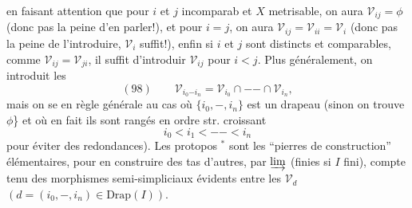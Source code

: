 
en faisant attention que pour $i$ et $j$ incomparab et $X$ metrisable, on  aura $\mathcal V_{ij}=\phi$  (donc pas la peine d'en parler!), et pour $i=j$, on aura $\mathcal V_{ij}=\mathcal V_{ii}=\mathcal V_i$ (donc pas la peine de l'introduire, $\mathcal V_i$ suffit!), enfin  si $i$ et $j$ sont distincts et comparables,  comme $\mathcal V_{ij}=\mathcal V_{ji}$, il suffit d'introduir $\mathcal V_{ij}$ pour  $i<j$. Plus généralement, on introduit les
\[(98)\qquad\mathcal V_{i_0\mathord{-}i_n}=\mathcal V_{i_0}\cap\mathord{-}\mathord{-}\cap\mathcal V_{i_n},\]
mais on se  en règle générale au cas où $\{i_0,\mathord{-},i_n\}$ est un drapeau (sinon on trouve $\phi$\} et où en fait ils sont rangés en ordre str. croissant
\[i_0<i_1<\mathord{-}\mathord{-}<i_n\]
\unsure{(}pour éviter des redondances). Les protopos $^*$ sont les ``pierres de construction'' élémentaires, pour en construire des tas d'autres, par $\varinjlim$ (finies si $I$ fini), compte tenu des morphismes semi-simpliciaux évidents entre les $\mathcal V_d$ $(d=(i_0,\mathord{-},i_n)\in\mathrm{Drap}(I))$.
